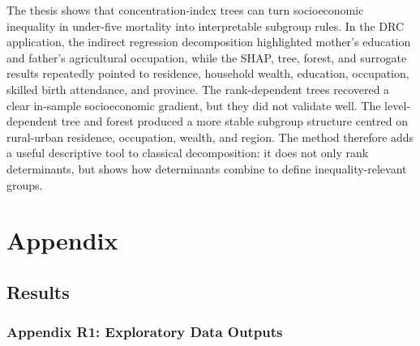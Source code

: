 \documentclass[
  11pt,
  a4paper,
]{article}
\begin{document}
The thesis shows that concentration-index trees can turn socioeconomic
inequality in under-five mortality into interpretable subgroup rules. In
the DRC application, the indirect regression decomposition highlighted
mother's education and father's agricultural occupation, while the SHAP,
tree, forest, and surrogate results repeatedly pointed to residence,
household wealth, education, occupation, skilled birth attendance, and
province. The rank-dependent trees recovered a clear in-sample
socioeconomic gradient, but they did not validate well. The
level-dependent tree and forest produced a more stable subgroup
structure centred on rural-urban residence, occupation, wealth, and
region. The method therefore adds a useful descriptive tool to classical
decomposition: it does not only rank determinants, but shows how
determinants combine to define inequality-relevant groups.

\section{Appendix}\label{appendix}

\subsection{Results}\label{results-1}

\subsubsection{Appendix R1: Exploratory Data
Outputs}\label{appendix-r1-exploratory-data-outputs}

\begingroup\fontsize{11}{13}\selectfont
\end{document}
